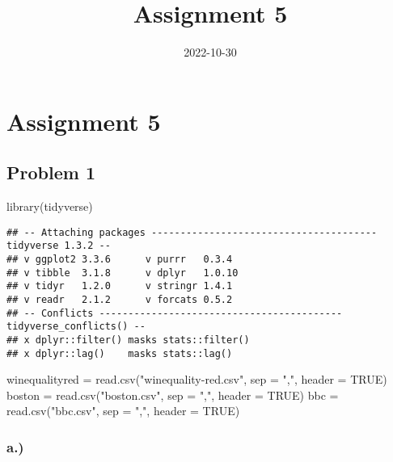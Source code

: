 \documentclass[
]{article}
\title{Assignment 5}
\author{}
\date{\vspace{-2.5em}2022-10-30}
\newenvironment{Shaded}{\begin{snugshade}}{\end{snugshade}}
\newcommand{\AttributeTok}[1]{\textcolor[rgb]{0.77,0.63,0.00}{#1}}
\newcommand{\ConstantTok}[1]{\textcolor[rgb]{0.00,0.00,0.00}{#1}}
\newcommand{\FunctionTok}[1]{\textcolor[rgb]{0.00,0.00,0.00}{#1}}
\newcommand{\NormalTok}[1]{#1}
\newcommand{\OtherTok}[1]{\textcolor[rgb]{0.56,0.35,0.01}{#1}}
\newcommand{\StringTok}[1]{\textcolor[rgb]{0.31,0.60,0.02}{#1}}
\begin{document}
\maketitle

\hypertarget{assignment-5}{%
\section{Assignment 5}\label{assignment-5}}

\hypertarget{problem-1}{%
\subsection{Problem 1}\label{problem-1}}

\begin{Shaded}
\begin{Highlighting}[]
\FunctionTok{library}\NormalTok{(tidyverse)}
\end{Highlighting}
\end{Shaded}

\begin{verbatim}
## -- Attaching packages --------------------------------------- tidyverse 1.3.2 --
## v ggplot2 3.3.6      v purrr   0.3.4 
## v tibble  3.1.8      v dplyr   1.0.10
## v tidyr   1.2.0      v stringr 1.4.1 
## v readr   2.1.2      v forcats 0.5.2 
## -- Conflicts ------------------------------------------ tidyverse_conflicts() --
## x dplyr::filter() masks stats::filter()
## x dplyr::lag()    masks stats::lag()
\end{verbatim}

\begin{Shaded}
\begin{Highlighting}[]
\NormalTok{winequalityred }\OtherTok{=} \FunctionTok{read.csv}\NormalTok{(}\StringTok{"winequality{-}red.csv"}\NormalTok{, }\AttributeTok{sep =} \StringTok{","}\NormalTok{, }\AttributeTok{header =} \ConstantTok{TRUE}\NormalTok{)}
\NormalTok{boston }\OtherTok{=} \FunctionTok{read.csv}\NormalTok{(}\StringTok{"boston.csv"}\NormalTok{, }\AttributeTok{sep =} \StringTok{","}\NormalTok{, }\AttributeTok{header =} \ConstantTok{TRUE}\NormalTok{)}
\NormalTok{bbc }\OtherTok{=} \FunctionTok{read.csv}\NormalTok{(}\StringTok{"bbc.csv"}\NormalTok{, }\AttributeTok{sep =} \StringTok{","}\NormalTok{, }\AttributeTok{header =} \ConstantTok{TRUE}\NormalTok{)}
\end{Highlighting}
\end{Shaded}

\hypertarget{a.}{%
\subsubsection{a.)}\label{a.}}
\end{document}
